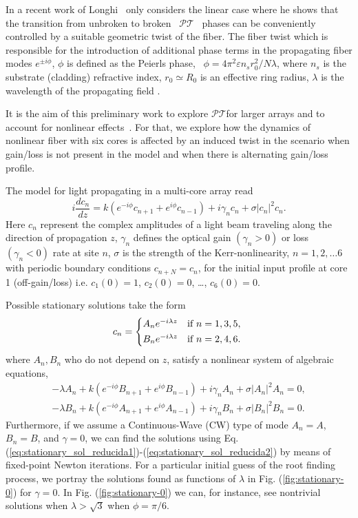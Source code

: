 \documentclass{aip-cp}
\newcommand{\pt}{$\mathcal{PT}$}
\begin{document}
In a recent work of Longhi~\cite{longhi2016pt} only considers the linear case where he shows that the
transition from unbroken to broken ~\pt~ phases can be conveniently controlled by a suitable geometric 
twist of the fiber. The fiber twist which is responsible for the introduction of additional phase 
terms in the propagating fiber modes $e^{\pm i\phi}$, $\phi$ is defined as the Peierls phase, 
\ $\phi=4\pi^{2}\varepsilon n_{s}r_{0}^{2}/N\lambda$, where $n_{s}$ is the substrate (cladding) 
refractive index, $r_{0}\simeq R_{0}$ is an effective ring radius, $\lambda$
is the wavelength of the propagating field \cite{longhi2007light}. 

It is the aim of this preliminary work to explore \pt for larger arrays and to account for nonlinear effects~\cite{zhang}.
For that, we explore how the dynamics of nonlinear fiber with six cores is affected by an
induced twist in the scenario when gain/loss is not present in the model and when
there is alternating gain/loss profile.

The model for light propagating in a multi-core array read 
\begin{equation}
i\frac{dc_n}{dz} = k( e^{-i\phi} c_{n+1} + e^{i\phi} c_{n-1} ) +  i\gamma_n c_n + \sigma|c_n|^2c_n.
\label{eq:nonlinear-multicore}
\end{equation}
Here $c_n$ represent the complex amplitudes of a light beam traveling along the direction 
of propagation $z$, $\gamma_n$ defines the optical gain $(\gamma_n > 0)$ or loss $(\gamma_n < 0)$ rate at 
site $n$, $\sigma$ is the strength of the Kerr-nonlinearity, $n = 1,2,\dots 6 $ with periodic boundary conditions  $c_{ n+N } = c_n$,
for the initial input profile at core 1 (off-gain/loss) i.e. $c_1(0) = 1$, $c_2(0) = 0 $, \dots, $c_6(0) = 0$.

Possible stationary solutions take the form 
\[ c_{n} = \begin{cases*}
                    A_{n}e^{-i\lambda z} & if  $n=1,3,5,$ \\
                    B_{n}e^{-i\lambda z} & if  $n=2,4,6.$
           \end{cases*} \]%
\noindent
where $A_n, B_n$ who do not depend on $z$, satisfy a nonlinear system of algebraic equations,
\begin{eqnarray}
-\lambda A_{n}	+	k\left(e^{-i\phi}B_{n+1}+e^{i\phi}B_{n-1}\right)+i\gamma_{n}A_{n} + \sigma|A_n|^2A_n=0, \label{eq:stationary_sol_reducida1}\\
-\lambda B_{n}	+	k\left(e^{-i\phi}A_{n+1}+e^{i\phi}A_{n-1}\right)+i\gamma_{n}B_{n} + \sigma|B_n|^2B_n=0. \label{eq:stationary_sol_reducida2}
\end{eqnarray}
\noindent
Furthermore, if we assume a Continuous-Wave (CW) type of mode $A_n=A$,  $B_n = B$, and  $\gamma = 0 $, we can find the solutions using 
Eq. (\ref{eq:stationary_sol_reducida1})-(\ref{eq:stationary_sol_reducida2}) 
by means of fixed-point Newton iterations. For a particular initial guess of the root finding process, 
we portray the solutions found as functions of $\lambda$ in Fig. (\ref{fig:stationary-0}) for $\gamma = 0$. In Fig. (\ref{fig:stationary-0})
we can, for instance, see nontrivial solutions when $\lambda > \sqrt{3}$ when $\phi=\pi/6.$
\end{document}
